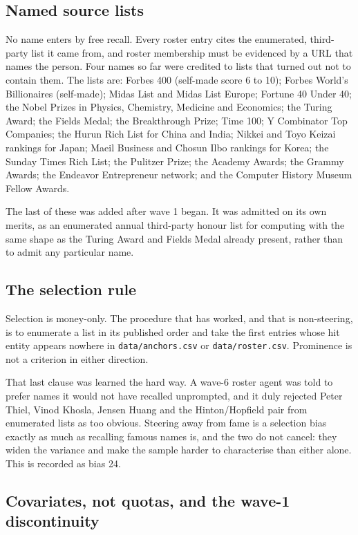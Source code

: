 \documentclass[11pt]{article}
\begin{document}
\subsection{Named source lists}

No name enters by free recall. Every roster entry cites the enumerated,
third-party list it came from, and roster membership must be evidenced by a URL
that names the person. Four names so far were credited to lists that turned out
not to contain them. The lists are: Forbes 400 (self-made score 6 to 10);
Forbes World's Billionaires (self-made); Midas List and Midas List Europe;
Fortune 40 Under 40; the Nobel Prizes in Physics, Chemistry, Medicine and
Economics; the Turing Award; the Fields Medal; the Breakthrough Prize; Time
100; Y Combinator Top Companies; the Hurun Rich List for China and India;
Nikkei and Toyo Keizai rankings for Japan; Maeil Business and Chosun Ilbo
rankings for Korea; the Sunday Times Rich List; the Pulitzer Prize; the Academy
Awards; the Grammy Awards; the Endeavor Entrepreneur network; and the Computer
History Museum Fellow Awards.

The last of these was added after wave 1 began. It was admitted on its own
merits, as an enumerated annual third-party honour list for computing with the
same shape as the Turing Award and Fields Medal already present, rather than to
admit any particular name.

\subsection{The selection rule}

Selection is money-only. The procedure that has worked, and that is
non-steering, is to enumerate a list in its published order and take the first
entries whose hit entity appears nowhere in \texttt{data/anchors.csv} or
\texttt{data/roster.csv}. Prominence is not a criterion in either direction.

That last clause was learned the hard way. A wave-6 roster agent was told to
prefer names it would not have recalled unprompted, and it duly rejected Peter
Thiel, Vinod Khosla, Jensen Huang and the Hinton/Hopfield pair from enumerated
lists as too obvious. Steering away from fame is a selection bias exactly as
much as recalling famous names is, and the two do not cancel: they widen the
variance and make the sample harder to characterise than either alone. This is
recorded as bias 24.

\subsection{Covariates, not quotas, and the wave-1 discontinuity}
\end{document}
